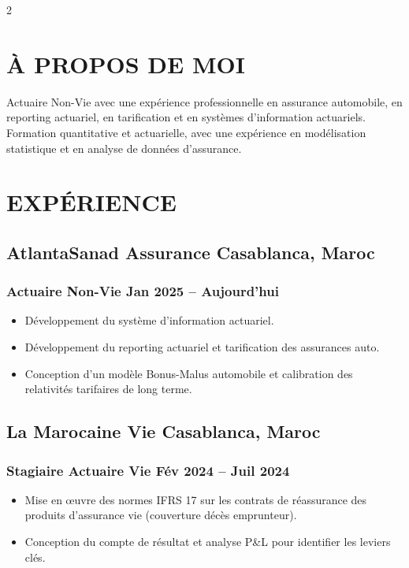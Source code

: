 \documentclass[11pt,asfal]{amdresume}
\begin{document}
\begin{paracol}{2}

\switchcolumn
\section{À PROPOS DE MOI}
Actuaire Non-Vie avec une expérience professionnelle en assurance automobile, en reporting actuariel, en tarification et en systèmes d'information actuariels. Formation quantitative et actuarielle, avec une expérience en modélisation statistique et en analyse de données d'assurance.
\vspace{0.1cm}

\section{EXPÉRIENCE}
\subsection{AtlantaSanad Assurance \hfill Casablanca, Maroc}
\subsubsection{Actuaire Non-Vie \dotfill Jan 2025 – Aujourd'hui}
\begin{itemize}
\item Développement du système d'information actuariel.
\item Développement du reporting actuariel et tarification des assurances auto.
\item Conception d'un modèle Bonus-Malus automobile et calibration des relativités tarifaires de long terme.
\end{itemize}

\subsection{La Marocaine Vie \hfill Casablanca, Maroc}
\subsubsection{Stagiaire Actuaire Vie \dotfill Fév 2024 – Juil 2024}
\begin{itemize}
\item Mise en œuvre des normes IFRS 17 sur les contrats de réassurance des produits d'assurance vie (couverture décès emprunteur).
\item Conception du compte de résultat et analyse P\&L pour identifier les leviers clés.
\end{itemize}


\end{paracol}
\end{document}
